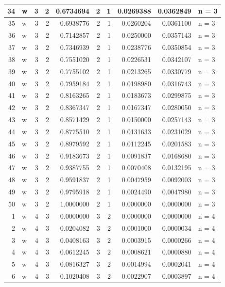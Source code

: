 \documentclass[
  letterpaper,
  DIV=11,
  numbers=noendperiod]{scrreprt}
\begin{document}
\begin{table}
\begin{tabular}[t]{r|l|r|r|r|r|r|r|r|l}
\hline
34 & w & 3 & 2 & 0.6734694 & 2 & 1 & 0.0269388 & 0.0362849 & n = 3\\
\hline
35 & w & 3 & 2 & 0.6938776 & 2 & 1 & 0.0260204 & 0.0361100 & n = 3\\
\hline
36 & w & 3 & 2 & 0.7142857 & 2 & 1 & 0.0250000 & 0.0357143 & n = 3\\
\hline
37 & w & 3 & 2 & 0.7346939 & 2 & 1 & 0.0238776 & 0.0350854 & n = 3\\
\hline
38 & w & 3 & 2 & 0.7551020 & 2 & 1 & 0.0226531 & 0.0342107 & n = 3\\
\hline
39 & w & 3 & 2 & 0.7755102 & 2 & 1 & 0.0213265 & 0.0330779 & n = 3\\
\hline
40 & w & 3 & 2 & 0.7959184 & 2 & 1 & 0.0198980 & 0.0316743 & n = 3\\
\hline
41 & w & 3 & 2 & 0.8163265 & 2 & 1 & 0.0183673 & 0.0299875 & n = 3\\
\hline
42 & w & 3 & 2 & 0.8367347 & 2 & 1 & 0.0167347 & 0.0280050 & n = 3\\
\hline
43 & w & 3 & 2 & 0.8571429 & 2 & 1 & 0.0150000 & 0.0257143 & n = 3\\
\hline
44 & w & 3 & 2 & 0.8775510 & 2 & 1 & 0.0131633 & 0.0231029 & n = 3\\
\hline
45 & w & 3 & 2 & 0.8979592 & 2 & 1 & 0.0112245 & 0.0201583 & n = 3\\
\hline
46 & w & 3 & 2 & 0.9183673 & 2 & 1 & 0.0091837 & 0.0168680 & n = 3\\
\hline
47 & w & 3 & 2 & 0.9387755 & 2 & 1 & 0.0070408 & 0.0132195 & n = 3\\
\hline
48 & w & 3 & 2 & 0.9591837 & 2 & 1 & 0.0047959 & 0.0092003 & n = 3\\
\hline
49 & w & 3 & 2 & 0.9795918 & 2 & 1 & 0.0024490 & 0.0047980 & n = 3\\
\hline
50 & w & 3 & 2 & 1.0000000 & 2 & 1 & 0.0000000 & 0.0000000 & n = 3\\
\hline
1 & w & 4 & 3 & 0.0000000 & 3 & 2 & 0.0000000 & 0.0000000 & n = 4\\
\hline
2 & w & 4 & 3 & 0.0204082 & 3 & 2 & 0.0001000 & 0.0000034 & n = 4\\
\hline
3 & w & 4 & 3 & 0.0408163 & 3 & 2 & 0.0003915 & 0.0000266 & n = 4\\
\hline
4 & w & 4 & 3 & 0.0612245 & 3 & 2 & 0.0008621 & 0.0000880 & n = 4\\
\hline
5 & w & 4 & 3 & 0.0816327 & 3 & 2 & 0.0014994 & 0.0002041 & n = 4\\
\hline
6 & w & 4 & 3 & 0.1020408 & 3 & 2 & 0.0022907 & 0.0003897 & n = 4\\

\end{tabular}
\end{table}
\end{document}
